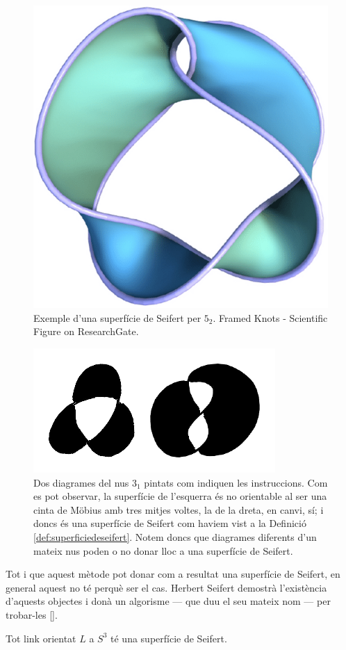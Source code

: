 \begin{figure}
	\centering
	\includegraphics[width=0.6\linewidth]{img/seifertsurface.png}
	\caption{Exemple d'una superfície de Seifert per $5_2$. Framed Knots - Scientific Figure on ResearchGate.}\label{fig:superficiedeseifert}
\end{figure}

\begin{figure}
	\centering
	\includegraphics[width=0.6\linewidth]{img/trefoilseifert.png}
	\caption{Dos diagrames del nus $3_1$ pintats com indiquen les instruccions. Com es pot observar, la superfície de l'esquerra és no orientable al ser una cinta de Möbius amb tres mitjes voltes, la de la dreta, en canvi, sí; i doncs és una superfície de Seifert com haviem vist a la Definició \ref{def:superficiedeseifert}. Notem doncs que diagrames diferents d'un mateix nus poden o no donar lloc a una superfície de Seifert.}\label{fig:trefoilseifert}
\end{figure}

Tot i que aquest mètode pot donar com a resultat una superfície de Seifert, en general aquest no té perquè ser el cas. Herbert Seifert demostrà l'existència d'aquests objectes i donà un algorisme --- que duu el seu mateix nom --- per trobar-les [\cite{seifert}].

\begin{theorem}\label{theo:existenciadesuperficiesdeseifert}
	Tot link orientat $L$ a $S^3$ té una superfície de Seifert.
\end{theorem}

